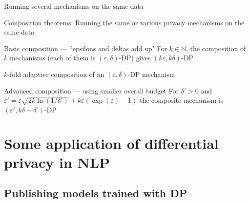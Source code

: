 \documentclass[12pt,aspectratio=169,handout]{beamer}
\begin{document}
\begin{frame}{Running several mechanisms on the same data}

Composition theorems: Running the same or various privacy mechanisms on the same data

\begin{block}{Basic composition --- ``epsilons and deltas add up"}
For $k \in \mathbb{N}$, the composition of $k$ mechanisms (each of them is $(\varepsilon, \delta)$-DP) gives $(k \varepsilon, k \delta)$-DP
\end{block}

$k$-fold adaptive composition of an $(\varepsilon, \delta)$-DP mechanism
	
\begin{block}{Advanced composition --- using smaller overall budget}
For $\delta' > 0$ and
$\varepsilon' = \varepsilon \sqrt{2 k \ln( 1 / \delta')} + k \varepsilon ( \exp(\varepsilon) - 1)$
the composite mechanism is $(\varepsilon', k \delta + \delta')$-DP
\end{block}


\end{frame}

\section{Some application of differential privacy in NLP}

\subsection{Publishing models trained with DP}
\end{document}

